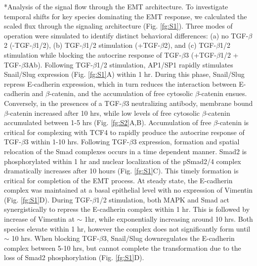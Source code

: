 \documentclass[12pt]{article}
\makeatletter
\renewcommand\subsection{\@startsection
	{subsection}{2}{0mm}
	{-0.05in}
	{-0.5\baselineskip}
	{\normalfont\normalsize\bfseries}}
\makeatother
\begin{document}
\subsection*{Analysis of the signal flow through the EMT architecture.}
To investigate temporal shifts for key species dominating the EMT response, we calculated the scaled flux through the signaling architecture (Fig. \ref{fg:S1}).
Three modes of operation were simulated to identify distinct behavioral differences: (a) no TGF-$\beta$2 (-TGF-$\beta$1/2), (b) TGF-$\beta$1/2 stimulation (+TGF-$\beta$2),
and (c) TGF-$\beta$1/2 stimulation while blocking the autocrine response of TGF-$\beta$3 (+TGF-$\beta$1/2 + TGF-$\beta$3Ab).
Following TGF-$\beta$1/2 stimulation, AP1/SP1 rapidly stimulates Snail/Slug expression (Fig. \ref{fg:S1}A) within 1 hr.
During this phase, Snail/Slug repress E-cadherin expression, which in turn reduces the interaction between E-cadherin and $\beta$-catenin, and the accumulation of free cytosolic $\beta$-catenin ensues.
Conversely, in the presences of a TGF-$\beta$3 neutralizing antibody, membrane bound $\beta$-catenin increased after 10 hrs,
while low levels of free cytosolic $\beta$-catenin accumulated between 1-5 hrs (Fig. \ref{fg:S2}A,B).  Accumulation of free $\beta$-catenin is critical for complexing with TCF4 to rapidly produce the autocrine response of TGF-$\beta$3 within 1-10 hrs.  Following TGF-$\beta$3 expression, formation and spatial relocation of the Smad complexes occurs in a time dependent manner.  Smad2 is phosphorylated within 1 hr and nuclear localization of the pSmad2/4 complex dramatically increases after 10 hours (Fig. \ref{fg:S1}C).  This timely formation is critical for completion of the EMT process.  At steady state, the E-cadherin complex was maintained at a basal epithelial level with no expression of Vimentin (Fig. \ref{fg:S1}D). During TGF-$\beta$1/2 stimulation, both MAPK and Smad act synergistically to repress the E-cadherin complex within 1 hr.
This is followed by increase of Vimentin at $\sim$ 1hr, while exponentially increasing around 10 hrs.
Both species elevate within 1 hr, however the complex does not significantly form until $\sim$ 10 hrs.
When blocking TGF-$\beta$3, Snail/Slug downregulates the E-cadherin complex between 5-10 hrs,
but cannot complete the transformation due to the loss of Smad2 phosphorylation (Fig. \ref{fg:S1}D).
\end{document}
